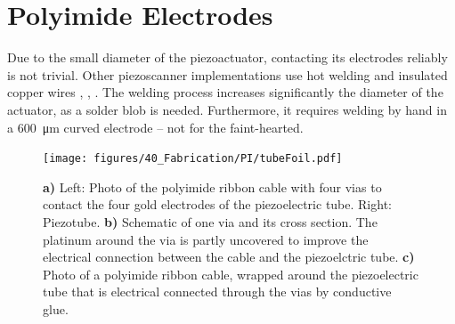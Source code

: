 

\clearpage
\section{Polyimide Electrodes}
Due to the small diameter of the piezoactuator, contacting its electrodes reliably is not trivial. Other piezoscanner implementations use hot welding and insulated copper wires \cite{Lee2010}, \cite{Meinert}, \cite{Huo2010}. The welding process increases significantly the diameter of the actuator, as a solder blob is needed. Furthermore, it requires welding by hand in a \SI{600}{\micro\meter} curved electrode -- not for the faint-hearted.

\begin{figure}[h!]\centering \texttt{[image: figures/40\_Fabrication/PI/tubeFoil.pdf]}
      \caption{\textbf{a)} Left: Photo of the polyimide ribbon cable with four vias to contact the four gold electrodes of the piezoelectric tube. Right: Piezotube.
      \textbf{b)} Schematic of one via and its cross section. The platinum around the via is partly uncovered to improve the electrical connection between the cable and the piezoelctric tube.
      \textbf{c)} Photo of a polyimide ribbon cable, wrapped around the piezoelectric tube that is electrical connected through the vias by conductive glue.}
      \label{fig:piRolled}
\end{figure}

